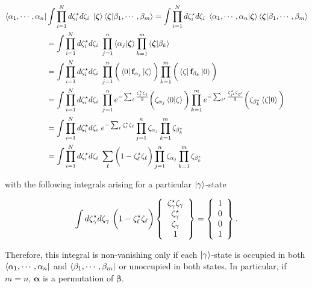 \documentclass{homework}
\begin{document}
\begin{tcolorbox}[colback=yellow!10!white,colframe=red!75!black,lowerbox=invisible, title = Fermionic closure relation]
\begin{equation}
    \begin{split}
        \bra{\alpha_1, \cdots, \alpha_n}& \int \prod_{i=1}^{N} d\zeta^\star_i d\zeta_i \textnormal{ } \ket{\bm{\zeta}}\bra{\bm{\zeta}} \ket{\beta_1, \cdots, \beta_m} = \int \prod_{i=1}^{N} d\zeta^\star_i d\zeta_i \textnormal{ } \bra{\alpha_1, \cdots, \alpha_n}\ket{\bm{\zeta}} \bra{\bm{\zeta}} \ket{\beta_1, \cdots, \beta_m}\\
        &= \int \prod_{i=1}^{N} d\zeta^\star_i d\zeta_i \textnormal{ } \prod_{j=1}^{n} \bra{\alpha_j}\ket{\bm{\zeta}} \prod_{k=1}^{m} \bra{\bm{\zeta}} \ket{\beta_k} \\
        &= \int \prod_{i=1}^{N} d\zeta^\star_i d\zeta_i \textnormal{ } \prod_{j=1}^{n} \bigg(\bra{0} {{\bf f}}_{\alpha_j} \ket{\zeta}\bigg) \prod_{k=1}^{m}\bigg(\bra{\zeta} {{\bf f}}_{\beta_k} \ket{0}\bigg) \\
        &= \int \prod_{i=1}^{N} d\zeta^\star_i d\zeta_i \textnormal{ } \prod_{j=1}^{n} e^{-\sum_{\ell} \frac{\zeta^\star_\ell\zeta_\ell}{2}} \bigg(\zeta_{\alpha_j} \bra{0}\ket{\zeta} \bigg) \prod_{k=1}^{m} e^{-\sum_{{\ell'}} \frac{\zeta^\star_{\ell'}\zeta_{\ell'}}{2}}\bigg(\zeta_{\beta_{k}^\star} \bra{\zeta} \ket{0}\bigg) \\
        &= \int \prod_{i=1}^{N} d\zeta^\star_i d\zeta_i \textnormal{ } e^{-\sum_{\ell} {\zeta^\star_\ell\zeta_\ell}} \prod_{j=1}^{n} \zeta_{\alpha_j} \prod_{k=1}^{m} \zeta_{\beta_{k}^\star} \\
        &= \int \prod_{i=1}^{N} d\zeta^\star_i d\zeta_i \textnormal{ } \sum_{\ell} \bigg(1-\zeta^\star_\ell\zeta_\ell \bigg)  \prod_{j=1}^{n} \zeta_{\alpha_j} \prod_{k=1}^{m} \zeta_{\beta_{k}^\star}
 \end{split}
\end{equation}

with the following integrals arising for a particular $\ket{\gamma}$-state

\begin{equation}
    \int d\zeta_{\gamma}^\star  d\zeta_{\gamma} \textnormal{ } \bigg(1- \zeta^\star_\ell\zeta_\ell \bigg) \left\{\begin{array}{c}
         \zeta_{\gamma}^\star \zeta_{\gamma} \\ \zeta_{\gamma}^\star \\
         \zeta_{\gamma} \\
         1
    \end{array}\right\} = \left\{\begin{array}{c}
         1  \\
         0  \\
         0  \\
         1
    \end{array}\right\}.
\end{equation}

Therefore, this integral is non-vanishing only if each $\ket{\gamma}$-state is occupied in both $\bra{\alpha_1, \cdots, \alpha_n}$ and $\bra{\beta_1, \cdots, \beta_m}$ or unoccupied in both states. In particular, if $m = n$, ${\bm \alpha}$ is a permutation of $\bm{\beta}$. 
\end{tcolorbox}
\end{document}
